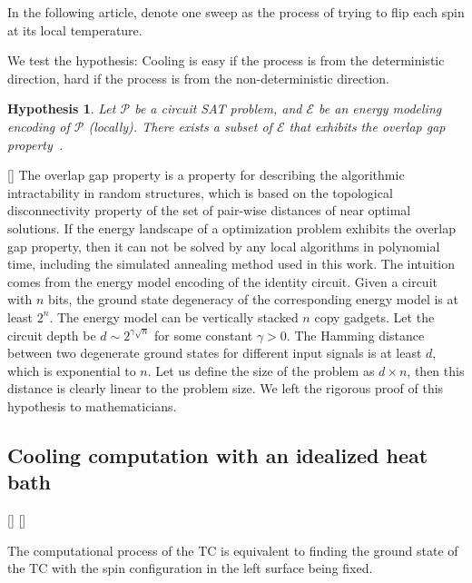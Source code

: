 \documentclass[twocolumn,superscriptaddress,english,showpacs,longbibliography]{revtex4-2}
\newtheorem{hyp}{Hypothesis}
\newcommand{\jinguo}[1]{[{\color{blue}{JGL: #1}}]}
\newcommand{\ym}[1]{[{\color{red}{YM: #1}}]}
\begin{document}
In the following article, denote one sweep as the process of trying to flip each spin at its local temperature.

We test the hypothesis: Cooling is easy if the process is from the
deterministic direction, hard if the process is from the
non-deterministic direction.

\begin{hyp}
Let $\mathcal{P}$ be a circuit SAT problem, and $\mathcal{E}$ be an energy modeling encoding of $\mathcal{P}$ (locally). There exists a subset of $\mathcal{E}$ that exhibits the overlap gap property~\cite{Gamarnik2021}.
\end{hyp}
\jinguo{Leave this issue to Maddie}
The overlap gap property is a property for describing the algorithmic intractability in random structures, which is based on the topological disconnectivity property of the set of pair-wise distances of near optimal solutions.
If the energy landscape of a optimization problem exhibits the overlap gap property, then it can not be solved by any local algorithms in polynomial time, including the simulated annealing method used in this work.
The intuition comes from the energy model encoding of the identity circuit.
Given a circuit with $n$ bits, the ground state degeneracy of the corresponding energy model is at least $2^n$.
The energy model can be vertically stacked $n$ copy gadgets.
Let the circuit depth be $d \sim 2^{\gamma \sqrt{n}}$ for some constant $\gamma > 0$.
The Hamming distance between two degenerate ground states for different input signals is at least $d$, which is exponential to $n$. Let us define the size of the problem as $d\times n$, then this distance is clearly linear to the problem size. We left the rigorous proof of this hypothesis to mathematicians.


\subsection{Cooling computation with an idealized heat bath}\label{cooling-computation-with-moving-heat-bath}

\jinguo{
    Need to introduce the heat zone.
}
\ym{
    I tried. Please check if it is clear and if i still need to cut some details off.
}


The computational process of the TC is equivalent to finding the ground state of the TC with the spin configuration in the left surface being fixed.
\end{document}
